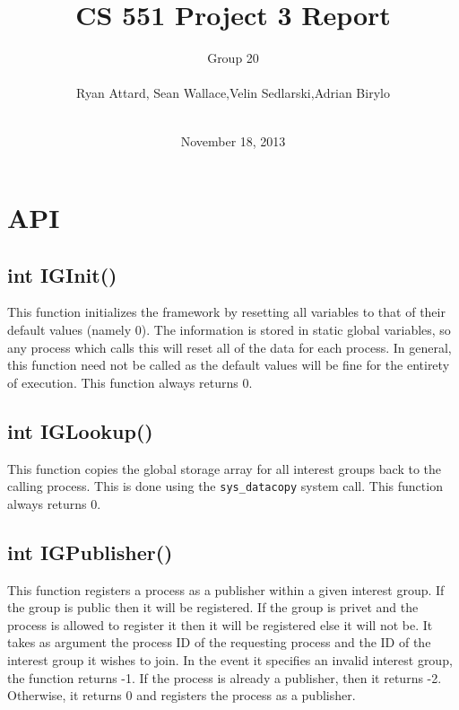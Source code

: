 \documentclass{article}
\title{CS 551 Project 3 Report}
\author{Group 20 \\\\ Ryan Attard, Sean Wallace,Velin Sedlarski,Adrian Birylo\\\\}
\date{November 18, 2013}
\begin{document}
\maketitle
\pagebreak 
\section{API}

\subsection{int IGInit()}
This function initializes the framework by resetting all variables to that of their default values (namely 0).  The information is stored in static global variables, so any process which calls this will reset all of the data for each process.  In general, this function need not be called as the default values will be fine for the entirety of execution.  This function always returns 0.

\subsection{int IGLookup()}
This function copies the global storage array for all interest groups back to the calling process.  This is done using the \verb+sys_datacopy+ system call.  This function always returns 0.


\subsection{int IGPublisher()}
This function registers a process as a publisher within a given interest group. If the group is public then it will be registered. If the group is privet and the process is allowed to register it then it will be registered else it will not be. It takes as argument the process ID of the requesting process and the ID of the interest group it wishes to join.  In the event it specifies an invalid interest group, the function returns -1.  If the process is already a publisher, then it returns -2.  Otherwise, it returns 0 and registers the process as a publisher.
\end{document}
